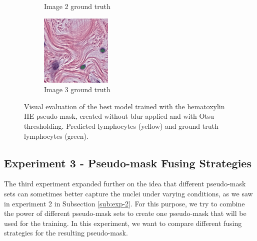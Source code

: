 \begin{figure}[H]
\begin{subfigure}[b]{0.32\textwidth}
    \caption{Image 2 ground truth}
  \end{subfigure}\hfill
  \begin{subfigure}[b]{0.32\textwidth}
    \centering
    \includegraphics[width=\linewidth]{assets/images/for_presentation/exp2-3-gt.png}
    \caption{Image 3 ground truth}
  \end{subfigure}
  \caption{Visual evaluation of the best model trained with the hematoxylin HE pseudo-mask, created without blur applied and with Otsu thresholding. Predicted lymphocytes (yellow) and ground truth lymphocytes (green).}
  \label{fig:exp2-results}
\end{figure}

\subsection{Experiment 3 - Pseudo-mask Fusing Strategies}
\label{sub:exp-3}
The third experiment expanded further on the idea that different pseudo-mask sets can sometimes better capture the nuclei under varying conditions, as we saw in experiment 2 in Subsection \ref{sub:exp-2}. For this purpose, we try to combine the power of different pseudo-mask sets to create one pseudo-mask that will be used for the training. In this experiment, we want to compare different fusing strategies for the resulting pseudo-mask.

